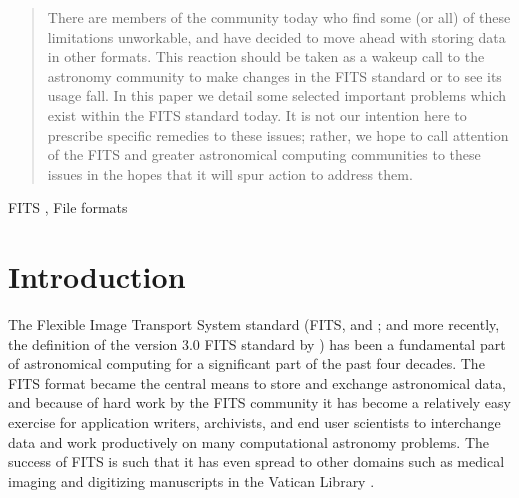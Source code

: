 \documentclass[final,authoryear,5p,times,twocolumn]{elsarticle}
\begin{document}
\begin{frontmatter}
\begin{abstract}
There are members of the community today who find some (or all) of
these limitations unworkable, and have decided to move ahead with
storing data in other formats. This reaction should be taken as a
wakeup call to the astronomy community to make changes in the FITS
standard or to see its usage fall. In this paper we detail some
selected important problems which exist within the FITS standard
today. It is not our intention here to prescribe specific remedies to
these issues; rather, we hope to call attention of the FITS and
greater astronomical computing communities to these issues in the
hopes that it will spur action to address them.

\end{abstract}

\begin{keyword}


FITS \sep
File formats

\end{keyword}

\end{frontmatter}


\newcommand{\aspconf}{ASP Conf.\ Ser}
\newcommand{\aap}{A\&A}
\newcommand{\aaps}{A\&AS}
\newcommand{\jrasc}{JRASC}
\newcommand{\qjras}{QJRAS}
\newcommand{\mnras}{MNRAS}

\section{Introduction}


The Flexible Image Transport System standard (FITS,
\citealt{1979ipia.coll..445W,1981A&AS...44..363W} and \citealt{2001A&A...376..359H}; and
more recently, the definition of the version 3.0 FITS standard by
\citealt{2010A&A...524A..42P}) has been a fundamental part of
astronomical computing for a significant part of the past four
decades. The FITS format became the central means to store and
exchange astronomical data, and because of hard work by the FITS
community it has become a relatively easy exercise for application
writers, archivists, and end user scientists to interchange data and
work productively on many computational astronomy problems. The
success of FITS is such that it has even spread to other domains such
as medical imaging and digitizing manuscripts in the Vatican Library
\citep{2006JRASC.100..242W,2012EWASSAlle}.
\end{document}
